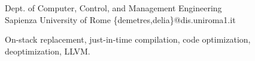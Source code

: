 \documentclass[10pt, reprint]{sigplanconf}
\begin{document}
\setlength{\pdfpageheight}{\paperheight}
\setlength{\pdfpagewidth}{\paperwidth}






\newcommand{\anon}{$\bullet\bullet\bullet\bullet\bullet$}

\title{}

\iffalse
\authorinfo{\anon\ \and \anon}
           {\anon} %
           {\anon} %
\fi

           {{\small Dept. of Computer, Control, and Management Engineering\\Sapienza University of Rome}} %
           {\{demetres,delia\}@dis.uniroma1.it} %

\maketitle

\begin{abstract}

\end{abstract}



\keywords
On-stack replacement, just-in-time compilation, code optimization, deoptimization, LLVM.










\end{document}

